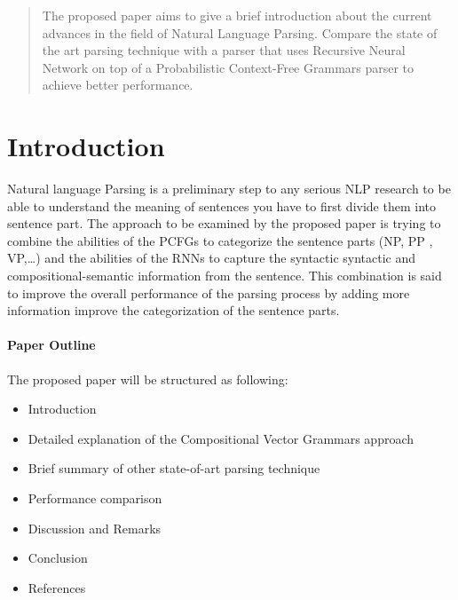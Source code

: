 \documentclass[12pt]{article}
\begin{document}
\maketitle
\newpage 

\begin{abstract}
The proposed paper aims to give a brief introduction about the current advances in the field of 
Natural Language Parsing. Compare the state of the art parsing technique with a parser that  uses Recursive Neural Network on top of a Probabilistic Context-Free Grammars parser to achieve better performance.
\end{abstract}

\section{Introduction}
Natural language Parsing is a preliminary step to any serious NLP research to be able to understand the meaning of sentences you have to first divide them into sentence part. The approach to be examined by the proposed paper is trying to combine the abilities of the PCFGs to categorize the sentence parts (NP, PP , VP,\ldots) and the abilities of the RNNs to capture the syntactic syntactic and compositional-semantic information from the sentence. This combination is said to improve the overall performance of the parsing process by adding more information improve the categorization of the sentence parts.

\paragraph{Paper Outline}
The proposed paper will be structured as following:
\begin{itemize}
\item Introduction
\item Detailed explanation of the Compositional Vector Grammars approach
\item Brief summary of other state-of-art parsing technique
\item Performance comparison
\item Discussion and Remarks
\item Conclusion
\item References
\end{itemize}
\end{document}
